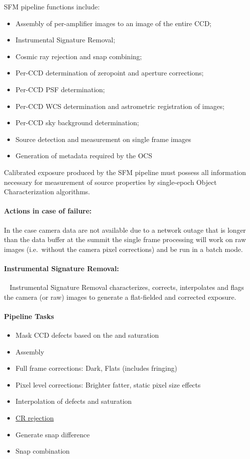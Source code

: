 SFM pipeline functions include:
\begin{itemize}
\item Assembly of per-amplifier images to an image of the entire CCD;
\item Instrumental Signature Removal;
\item Cosmic ray rejection and snap combining;
\item Per-CCD determination of zeropoint and aperture corrections;
\item Per-CCD PSF determination;
\item Per-CCD WCS determination and astrometric registration of images;
\item Per-CCD sky background determination;
\item Source detection and measurement on single frame images
\item Generation of metadata required by the OCS
\end{itemize}

Calibrated exposure produced by the SFM pipeline must possess all information necessary for measurement of source properties by single-epoch Object Characterization algorithms.

\paragraph{Actions in case of failure:}

In the case camera data are not available due to a network outage that is longer than the data buffer at the summit the single frame processing will work on raw images (i.e.\ without the camera pixel corrections) and be run in a batch mode. 



\paragraph{Instrumental Signature Removal:}~
\label{sec:apISR}
Instrumental Signature Removal characterizes, corrects, interpolates
and flags the camera (or raw) images to generate a flat-fielded and corrected
exposure.

\paragraph{Pipeline Tasks}
\begin{itemize}
\item Mask CCD defects based on the and saturation
\item Assembly
\item Full frame corrections: Dark, Flats (includes fringing)
\item Pixel level corrections: Brighter fatter, static pixel size effects
\item Interpolation of defects and saturation
\item \hyperref[sec:artifact]{CR rejection}
\item Generate snap difference
\item Snap combination
\end{itemize}


